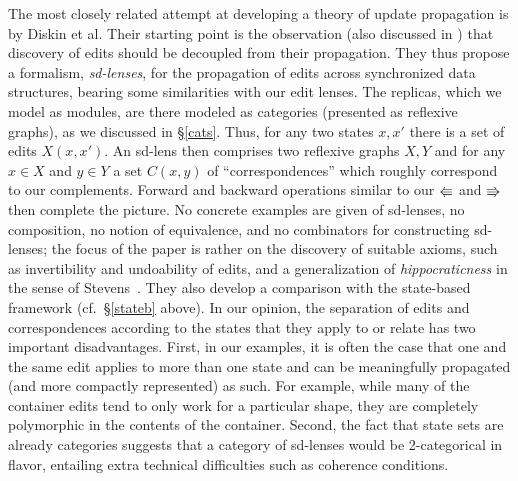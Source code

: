 \newif \iftikz  \tikztrue
The most closely related attempt at developing a theory of update
propagation is \cite{Diskin-Delta11} by Diskin et al. Their starting
point is the observation (also discussed in \cite{Matching10}) that discovery of
edits should be decoupled from their propagation. They thus propose a
formalism, \emph{sd-lenses}, for the propagation of edits across
synchronized data structures, bearing some similarities with our
edit lenses. The replicas, which we model as modules, are there modeled
as categories (presented as reflexive graphs)\iffull, as we discussed in 
\S \ref{cats}\fi. Thus, for any two states $x,x'$ there is a set of
edits $X(x,x')$. An sd-lens then comprises two reflexive graphs $X,Y$
and for any $x\in X$ and $y\in Y$ a set $C(x,y)$ of
``correspondences'' which roughly correspond to our
complements. Forward and backward operations similar to our $\mathord{\Lleftarrow}$ and
$\mathord{\Rrightarrow}$ then complete the picture. No concrete
examples are given of sd-lenses, no composition, no notion of equivalence, and
no combinators for constructing sd-lenses; the focus of the paper is
rather on the discovery of suitable axioms, such as invertibility and
undoability of edits, and a 
generalization of {\em hippocraticness} in the sense of
Stevens~\cite{Stevens07}. They also develop a comparison 
with the state-based framework (cf.\ \S \ref{stateb} above). In
our opinion, the separation of edits and correspondences according to
the states that they apply to or relate has two important
disadvantages.  First, in our examples, it is often the case that one
and the same edit applies to more than one state and can be
meaningfully propagated (and more compactly represented) as such. For example, while many of the
container edits tend to only work for a particular shape, they are
completely polymorphic in the contents of the container. Second, the
fact that state sets are already categories suggests 
that a category of sd-lenses would be
2-categorical in flavor, entailing extra technical difficulties such as
coherence conditions. 

